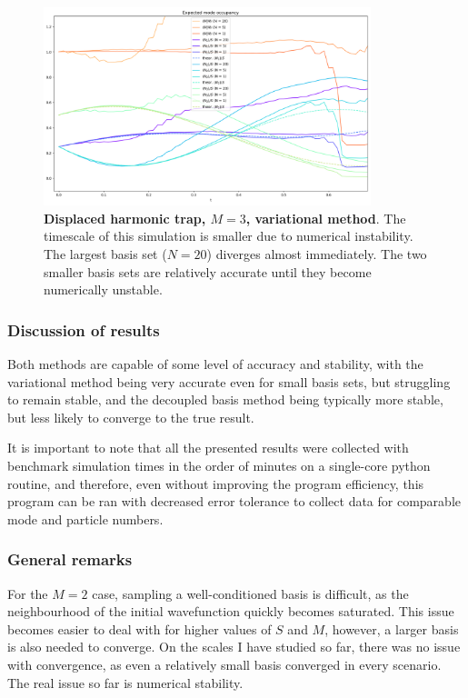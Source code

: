 \documentclass[12pt]{article}
\begin{document}
	\begin{figure}
	\begin{center}
	\vspace{-2cm}
	\includegraphics[width=0.85\textwidth]{images/DHT_M=3}
	\caption{\textbf{Displaced harmonic trap, $M=3$, variational method}. The timescale of this simulation is smaller due to numerical instability. The largest basis set ($N=20$) diverges almost immediately. The two smaller basis sets are relatively accurate until they become numerically unstable.}\label{fig:DHT_M=3_variational}
	\end{center}
	\end{figure}
	
	\subsubsection{Discussion of results}
	Both methods are capable of some level of accuracy and stability, with the variational method being very accurate even for small basis sets, but struggling to remain stable, and the decoupled basis method being typically more stable, but less likely to converge to the true result.
	
	It is important to note that all the presented results were collected with benchmark simulation times in the order of minutes on a single-core python routine, and therefore, even without improving the program efficiency, this program can be ran with decreased error tolerance to collect data for comparable mode and particle numbers.
	
	\subsubsection{General remarks}
	For the $M=2$ case, sampling a well-conditioned basis is difficult, as the neighbourhood of the initial wavefunction quickly becomes saturated. This issue becomes easier to deal with for higher values of $S$ and $M$, however, a larger basis is also needed to converge. On the scales I have studied so far, there was no issue with convergence, as even a relatively small basis converged in every scenario. The real issue so far is numerical stability.
	
\end{document}
